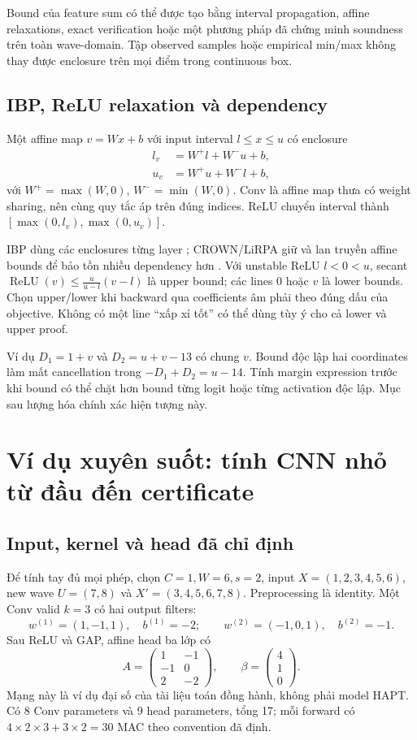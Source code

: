\documentclass[11pt,a4paper]{article}
\newcommand{\relu}{\operatorname{ReLU}}
\theoremstyle{definition}
\begin{document}
Bound của feature sum có thể được tạo bằng interval propagation, affine
relaxations, exact verification hoặc một phương pháp đã chứng minh
soundness trên toàn wave-domain. Tập observed samples hoặc empirical
min/max không thay được enclosure trên mọi điểm trong continuous box.

\subsection{IBP, ReLU relaxation và dependency}
Một affine map $v=Wx+b$ với input interval $l\le x\le u$ có enclosure
\begin{align}
l_v&=W^+l+W^-u+b,\\
u_v&=W^+u+W^-l+b,
\end{align}
với $W^+=\max(W,0)$, $W^-=\min(W,0)$. Conv là affine map thưa có
weight sharing, nên cùng quy tắc áp trên đúng indices. ReLU chuyển
interval thành $[\max(0,l_v),\max(0,u_v)]$.

IBP dùng các enclosures từng layer \cite{ibp}; CROWN/LiRPA giữ và lan
truyền affine bounds để bảo tồn nhiều dependency hơn \cite{crown,lirpa}.
Với unstable ReLU $l<0<u$, secant
$\relu(v)\le \frac{u}{u-l}(v-l)$ là upper bound; các lines 0 hoặc $v$
là lower bounds. Chọn upper/lower khi backward qua coefficients âm
phải theo đúng dấu của objective. Không có một line ``xấp xỉ tốt'' có
thể dùng tùy ý cho cả lower và upper proof.

Ví dụ $D_1=1+v$ và $D_2=u+v-13$ có chung $v$. Bound độc lập hai
coordinates làm mất cancellation trong $-D_1+D_2=u-14$. Tính margin
expression trước khi bound có thể chặt hơn bound từng logit hoặc từng
activation độc lập. Mục sau lượng hóa chính xác hiện tượng này.

\section{Ví dụ xuyên suốt: tính CNN nhỏ từ đầu đến certificate}
\subsection{Input, kernel và head đã chỉ định}
Để tính tay đủ mọi phép, chọn $C=1,W=6,s=2$, input
$X=(1,2,3,4,5,6)$, new wave $U=(7,8)$ và
$X'=(3,4,5,6,7,8)$. Preprocessing là identity. Một Conv valid $k=3$ có
hai output filters:
\begin{equation}
w^{(1)}=(1,-1,1),\quad b^{(1)}=-2;\qquad
w^{(2)}=(-1,0,1),\quad b^{(2)}=-1.
\end{equation}
Sau ReLU và GAP, affine head ba lớp có
\begin{equation}
A=\begin{pmatrix}1&-1\\-1&0\\2&-2\end{pmatrix},\qquad
\beta=\begin{pmatrix}4\\1\\0\end{pmatrix}.
\end{equation}
Mạng này là ví dụ đại số của tài liệu toán đồng hành, không phải model
HAPT. Có 8 Conv parameters và 9 head parameters, tổng 17; mỗi forward
có $4\times2\times3+3\times2=30$ MAC theo convention đã định.
\end{document}
